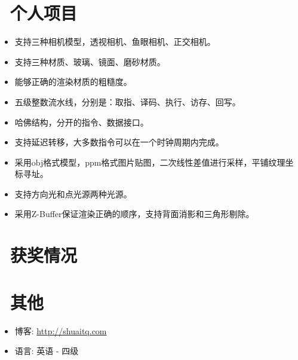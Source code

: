 \documentclass{resume}
\begin{document}

\section{\faGithubAlt\ 个人项目}
\begin{itemize}
  \item 支持三种相机模型，透视相机、鱼眼相机、正交相机。
  \item 支持三种材质、玻璃、镜面、磨砂材质。
  \item 能够正确的渲染材质的粗糙度。
\end{itemize}

\begin{itemize}
  \item 五级整数流水线，分别是：取指、译码、执行、访存、回写。
  \item 哈佛结构，分开的指令、数据接口。
  \item 支持延迟转移，大多数指令可以在一个时钟周期内完成。
\end{itemize}

\begin{itemize}
  \item 采用obj格式模型，ppm格式图片贴图，二次线性差值进行采样，平铺纹理坐标寻址。
  \item 支持方向光和点光源两种光源。
  \item 采用Z-Buffer保证渲染正确的顺序，支持背面消影和三角形剔除。
\end{itemize}

\section{\faHeartO\ 获奖情况}

\section{\faInfo\ 其他}
\begin{itemize}[parsep=0.5ex]
  \item 博客: \url{http://shuaitq.com}
  \item 语言: 英语 - 四级
\end{itemize}

%
%
\end{document}
